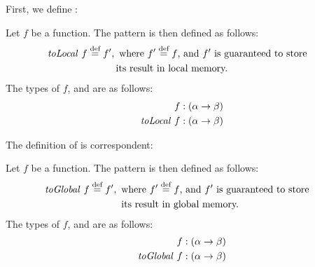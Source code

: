 First, we define \toLocal:
\begin{definition}
  \label{definition:pattern:toLocal}
  Let $f$ be a function.
  The \toLocal pattern is then defined as follows:
  \begin{align*}
    \text{\textit{toLocal}}\ f &\stackrel{\textrm{\scriptsize def}}{=} f',
    \begin{aligned}[t]
      &\text{ where $f' \stackrel{\textrm{\scriptsize def}}{=} f$, and  $f'$ is guaranteed to store}\\
      &\text{its result in local memory.}
    \end{aligned}
  \end{align*}
  The types of $f$, and \toLocal are as follows:
  \begin{align*}
    f &: (\alpha \rightarrow \beta)\\
    \text{\textit{toLocal}}\ f &: (\alpha \rightarrow \beta)
  \end{align*}
\end{definition}

\noindent
The definition of \toGlobal is correspondent:
\begin{definition}
  \label{definition:pattern:toGlobal}
  Let $f$ be a function.
  The \toGlobal pattern is then defined as follows:
  \begin{align*}
    \text{\textit{toGlobal}}\ f &\stackrel{\textrm{\scriptsize def}}{=} f',
    \begin{aligned}[t]
      &\text{ where $f' \stackrel{\textrm{\scriptsize def}}{=} f$, and $f'$ is guaranteed to store}\\
      &\text{ its result in global memory.}
    \end{aligned}
  \end{align*}
  The types of $f$, and \toLocal are as follows:
  \begin{align*}
    f &: (\alpha \rightarrow \beta)\\
    \text{\textit{toGlobal}}\ f &: (\alpha \rightarrow \beta)
  \end{align*}
\end{definition}





